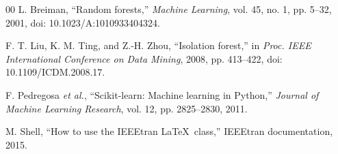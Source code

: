 \documentclass[conference]{IEEEtran}
\begin{document}
\balance
\begin{thebibliography}{00}
L. Breiman, ``Random forests,'' \emph{Machine Learning}, vol. 45, no. 1, pp. 5--32, 2001, doi: 10.1023/A:1010933404324.

F. T. Liu, K. M. Ting, and Z.-H. Zhou, ``Isolation forest,'' in \emph{Proc. IEEE International Conference on Data Mining}, 2008, pp. 413--422, doi: 10.1109/ICDM.2008.17.

F. Pedregosa \emph{et al.}, ``Scikit-learn: Machine learning in Python,'' \emph{Journal of Machine Learning Research}, vol. 12, pp. 2825--2830, 2011.

M. Shell, ``How to use the IEEEtran \LaTeX\ class,'' IEEEtran documentation, 2015.
\end{thebibliography}
\end{document}
